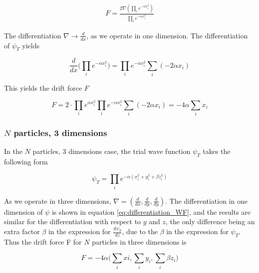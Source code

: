 \documentclass[norsk,a4paper,12pt]{article}
\begin{document}
\begin{align}
	F = \frac{2 \nabla ( \prod_i e^{-\alpha x_i^2} )}{ \prod_i e^{-\alpha x_i^2} }
\end{align}

The differentiation $\nabla \rightarrow \frac{d }{d x}$, as we operate in one dimension. The differentiation of $\psi_T$ yields

\begin{equation}
	\label{eq:differentiation_WF}
	\frac{d}{d x} \Big( \prod_i e^{-\alpha x_i^2}\Big) =  \prod_i e^{-\alpha x_i^2} \sum_i (-2\alpha x_i)
\end{equation}

This yields the drift force $F$

\begin{equation}
	F =  2\cdot \prod_i e^{\alpha x_i^2}   \prod_i e^{-\alpha x_i^2} \sum_i (-2\alpha x_i) = - 4 \alpha \sum_i x_i
\end{equation}

\subsubsection{$N$ particles, 3 dimensions}

In the $N$ particles, $3$ dimensions case, the trial wave function $\psi_T$ takes the following form

\begin{equation}
	\psi_T = \prod_i e^{- \alpha (x_i^2 + y_i^2 + \beta z_i^2)} 
\end{equation}

As we operate in three dimensions, $\nabla = (\frac{d}{dx}, \frac{d}{dy}, \frac{d}{dy})$. The differentiation in one dimension of $\psi$ is shown in equation \ref{eq:differentiation_WF}, and the results are similar for the differentiation with respect to $y$ and $z$, the only difference being an extra factor $\beta$ in the expression for $\frac{d \psi_T}{d z}$, due to the $\beta$ in the expression for $\psi_T$. Thus the drift force F for $N$ particles in three dimensions is 

\begin{equation}
	F = -4 \alpha \Big(\sum_i xi, \sum_i y_i, \sum_i \beta z_i \Big)
\end{equation}
\end{document}
